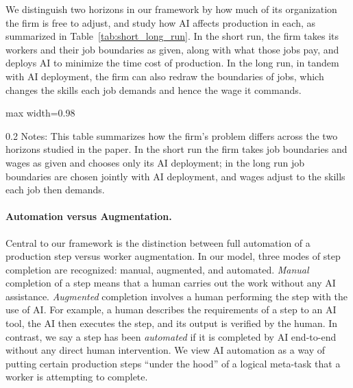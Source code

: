 We distinguish two horizons in our framework by how much of its organization the firm is free to adjust, and study how AI affects production in each, as summarized in Table~\ref{tab:short_long_run}.
In the short run, the firm takes its workers and their job boundaries as given, along with what those jobs pay, and deploys AI to minimize the time cost of production.
In the long run, in tandem with AI deployment, the firm can also redraw the boundaries of jobs, which changes the skills each job demands and hence the wage it commands.
\begin{table}[!t]
    \centering
    \vspace{0.1cm}
    \caption{Summary of AI's Impact in the Short and Long Run}
    \label{tab:short_long_run}
    \footnotesize
    \begin{adjustbox}{max width=0.98\textwidth}
    
    \end{adjustbox}

    \begin{minipage}{1\linewidth}
\begin{spacing}{0.2}
{\fontsize{9.5pt}{10pt}\selectfont Notes: This table summarizes how the firm's problem differs across the two horizons studied in the paper. In the short run the firm takes job boundaries and wages as given and chooses only its AI deployment; in the long run job boundaries are chosen jointly with AI deployment, and wages adjust to the skills each job then demands.}
\end{spacing}
\end{minipage}
\end{table}


\paragraph{Automation versus Augmentation.}
Central to our framework is the distinction between full automation of a production step versus worker augmentation.
In our model, three modes of step completion are recognized: manual, augmented, and automated.
\emph{Manual} completion of a step means that a human carries out the work without any AI assistance.
\emph{Augmented} completion involves a human performing the step with the use of AI.
For example, a human describes the requirements of a step to an AI tool, the AI then executes the step, and its output is verified by the human.
In contrast, we say a step has been \emph{automated} if it is completed by AI end-to-end without any direct human intervention.
We view AI automation as a way of putting certain production steps ``under the hood'' of a logical meta-task that a worker is attempting to complete.

